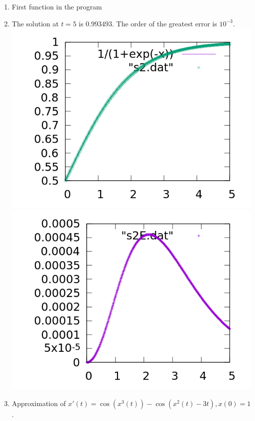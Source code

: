 \documentclass[12pt, letterpaper]{article}
\begin{document}
	\begin{enumerate}
		
		\item First function in the program
		\item The solution at $t = 5$ is $0.993493$.  The order of the greatest error is $10^{-3}$.  \\
		\includegraphics[scale=1.00]{s2solu.png}
		\includegraphics[scale=1.00]{s2err.png}\\
		\item Approximation of $x'(t) = \cos(x^3(t)) - \cos(x^2(t) -3t), x(0) = 1 $.\\

\end{enumerate}
\end{document}
